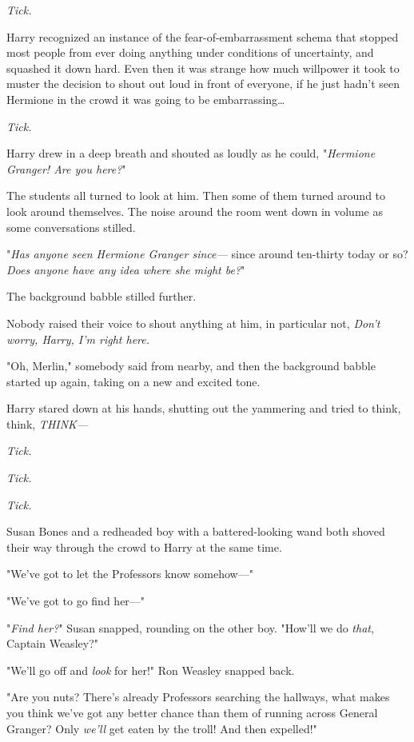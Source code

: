 \emph{Tick.}

Harry recognized an instance of the fear-of-embarrassment schema that stopped 
most people from ever doing anything under conditions of uncertainty, and 
squashed it down hard. Even then it was strange how much willpower it took to 
muster the decision to shout out loud in front of everyone, if he just hadn't 
seen Hermione in the crowd it was going to be embarrassing{\ldots}

\emph{Tick.}

Harry drew in a deep breath and shouted as loudly as he could, "\emph{Hermione 
Granger! Are you here?}"

The students all turned to look at him. Then some of them turned around to look 
around themselves. The noise around the room went down in volume as some 
conversations stilled.

"\emph{Has anyone seen Hermione Granger since---} since around ten-thirty today 
or so? \emph{Does anyone have any idea where she might be?}"

The background babble stilled further.

Nobody raised their voice to shout anything at him, in particular not, 
\emph{Don't worry, Harry, I'm right here.}

"Oh, Merlin," somebody said from nearby, and then the background babble started 
up again, taking on a new and excited tone.

Harry stared down at his hands, shutting out the yammering and tried to think, 
think, \emph{THINK---}

\emph{Tick.}

\emph{Tick.}

\emph{Tick.}

Susan Bones and a redheaded boy with a battered-looking wand both shoved their 
way through the crowd to Harry at the same time.

"We've got to let the Professors know somehow---"

"We've got to go find her---"

"\emph{Find her?}" Susan snapped, rounding on the other boy. "How'll we do 
\emph{that}, Captain Weasley?"

"We'll go off and \emph{look} for her!" Ron Weasley snapped back.

"Are you nuts? There's already Professors searching the hallways, what makes 
you think we've got any better chance than them of running across General 
Granger? Only \emph{we'll} get eaten by the troll! And then expelled!"

